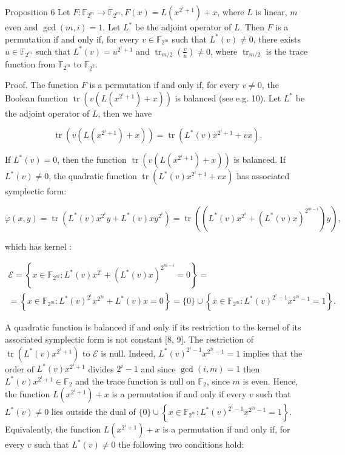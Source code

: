 \documentclass[10pt]{article}
\begin{document}
Proposition 6 Let $F: \mathbb{F}_{2^{m}} \rightarrow \mathbb{F}_{2^{m}}, F(x)=L\left(x^{2^{i}+1}\right)+x$, where $L$ is linear, $m$ even and $\operatorname{gcd}(m, i)=1$. Let $L^{*}$ be the adjoint operator of $L$. Then $F$ is a permutation if and only if, for every $v \in \mathbb{F}_{2^{m}}$ such that $L^{*}(v) \neq 0$, there exists $u \in \mathbb{F}_{2^{m}}$ such that $L^{*}(v)=u^{2^{i}+1}$ and $\operatorname{tr}_{m / 2}\left(\frac{v}{u}\right) \neq 0$, where $\operatorname{tr}_{m / 2}$ is the trace function from $\mathbb{F}_{2^{m}}$ to $\mathbb{F}_{2^{2}}$.

Proof. The function $F$ is a permutation if and only if, for every $v \neq 0$, the Boolean function $\operatorname{tr}\left(v\left(L\left(x^{2^{i}+1}\right)+x\right)\right)$ is balanced (see e.g. 10). Let $L^{*}$ be the adjoint operator of $L$, then we have

$$
\operatorname{tr}\left(v\left(L\left(x^{2^{i}+1}\right)+x\right)\right)=\operatorname{tr}\left(L^{*}(v) x^{2^{i}+1}+v x\right) .
$$

If $L^{*}(v)=0$, then the function $\operatorname{tr}\left(v\left(L\left(x^{2^{i}+1}\right)+x\right)\right)$ is balanced. If $L^{*}(v) \neq 0$, the quadratic function $\operatorname{tr}\left(L^{*}(v) x^{2^{i}+1}+v x\right)$ has associated symplectic form:

$$
\varphi(x, y)=\operatorname{tr}\left(L^{*}(v) x^{2^{i}} y+L^{*}(v) x y^{2^{i}}\right)=\operatorname{tr}\left(\left(L^{*}(v) x^{2^{i}}+\left(L^{*}(v) x\right)^{2^{m-i}}\right) y\right),
$$

which has kernel :

$$
\begin{gathered}
\mathcal{E}=\left\{x \in \mathbb{F}_{2^{m}}: L^{*}(v) x^{2^{i}}+\left(L^{*}(v) x\right)^{2^{m-i}}=0\right\}= \\
=\left\{x \in \mathbb{F}_{2^{m}}: L^{*}(v)^{2^{i}} x^{2^{2 i}}+L^{*}(v) x=0\right\}=\{0\} \cup\left\{x \in \mathbb{F}_{2^{m}}: L^{*}(v)^{2^{i}-1} x^{2^{2 i}-1}=1\right\} .
\end{gathered}
$$

A quadratic function is balanced if and only if its restriction to the kernel of its associated symplectic form is not constant [8, 9]. The restriction of $\operatorname{tr}\left(L^{*}(v) x^{2^{i}+1}\right)$ to $\mathcal{E}$ is null. Indeed, $L^{*}(v)^{2^{i}-1} x^{2^{2 i}-1}=1$ implies that the order of $L^{*}(v) x^{2^{i}+1}$ divides $2^{i}-1$ and since $\operatorname{gcd}(i, m)=1$ then $L^{*}(v) x^{2^{i}+1} \in \mathbb{F}_{2}$ and the trace function is null on $\mathbb{F}_{2}$, since $m$ is even. Hence, the function $L\left(x^{2^{i}+1}\right)+x$ is a permutation if and only if every $v$ such that $L^{*}(v) \neq 0$ lies outside the dual of $\{0\} \cup\left\{x \in \mathbb{F}_{2^{m}}: L^{*}(v)^{2^{i}-1} x^{2^{2 i}-1}=1\right\}$. Equivalently, the function $L\left(x^{2^{i}+1}\right)+x$ is a permutation if and only if, for every $v$ such that $L^{*}(v) \neq 0$ the following two conditions hold:
\end{document}
